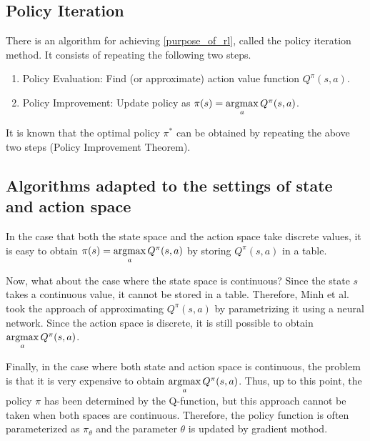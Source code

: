 \documentclass[english, dvipdfmx]{ampmt}             %
\newcommand{\argmax}{\mathop{\rm argmax}\limits}
\begin{document}
\subsection{Policy Iteration}
There is an algorithm for achieving \eqref{purpose_of_rl}, called the policy iteration method. It consists of repeating the following two steps.
\begin{enumerate}
	\item Policy Evaluation: Find (or approximate) action value function $Q^{\pi}(s,a)$.
	\item Policy Improvement: Update policy as $\pi(s)=\argmax_aQ^{\pi}(s,a)$.
\end{enumerate}
It is known that the optimal policy $\pi^{*}$ can be obtained by repeating the above two steps (Policy Improvement Theorem).%

\subsection{Algorithms adapted to the settings of state and action space}
\label{sec:policy_improvement}
In the case that both the state space and the action space take discrete values, it is easy to obtain
$\pi(s)=\argmax_aQ^{\pi}(s,a)$ by storing $Q^{\pi}(s,a)$ in a table.\par
Now, what about the case where the state space is continuous? Since the state $s$ takes a continuous value, it cannot be stored in a table. Therefore, Minh et al.\cite{DQN} took the approach of approximating $Q^{\pi}(s,a)$ by parametrizing it using a neural network. Since the action space is discrete, it is still possible to obtain $\argmax_aQ^{\pi}(s,a)$. \par
Finally, in the case where both state and action space is continuous, the problem is that it is very expensive to obtain $\argmax_aQ^{\pi}(s,a)$. Thus, up to this point, the policy $\pi$ has been determined by the Q-function, but this approach cannot be taken when both spaces are continuous. 
Therefore, the policy function is often parameterized as $\pi_{\theta}$ and the parameter $\theta$ is updated by gradient mothod. 
\end{document}
